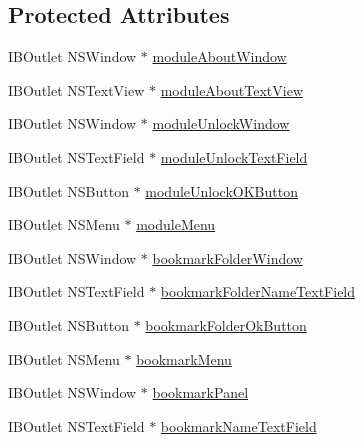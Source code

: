 \subsection*{Protected Attributes}
\begin{DoxyCompactItemize}
\item 
I\-B\-Outlet N\-S\-Window $\ast$ \hyperlink{interface_left_side_bar_view_controller_a1e4ea86bd5ee4a5fd7e020cee6fe9af7}{module\-About\-Window}
\item 
I\-B\-Outlet N\-S\-Text\-View $\ast$ \hyperlink{interface_left_side_bar_view_controller_a839025947128cd02e03a6919cd53d2ff}{module\-About\-Text\-View}
\item 
I\-B\-Outlet N\-S\-Window $\ast$ \hyperlink{interface_left_side_bar_view_controller_a779a4034ed4b58ecbd46b8160b66a813}{module\-Unlock\-Window}
\item 
I\-B\-Outlet N\-S\-Text\-Field $\ast$ \hyperlink{interface_left_side_bar_view_controller_ad02f4a39f2d83e2f0cec6b4806814f5f}{module\-Unlock\-Text\-Field}
\item 
I\-B\-Outlet N\-S\-Button $\ast$ \hyperlink{interface_left_side_bar_view_controller_ae5a86453a2ffc18776bce51a1eb735fe}{module\-Unlock\-O\-K\-Button}
\item 
I\-B\-Outlet N\-S\-Menu $\ast$ \hyperlink{interface_left_side_bar_view_controller_a7db6a582718e6fb4b4bf7d4e483e4c85}{module\-Menu}
\item 
I\-B\-Outlet N\-S\-Window $\ast$ \hyperlink{interface_left_side_bar_view_controller_a0d525fffbf58da7bfc279fc81c0466b8}{bookmark\-Folder\-Window}
\item 
I\-B\-Outlet N\-S\-Text\-Field $\ast$ \hyperlink{interface_left_side_bar_view_controller_a1d0054c7da6e997cbf329ff2fd2f1680}{bookmark\-Folder\-Name\-Text\-Field}
\item 
I\-B\-Outlet N\-S\-Button $\ast$ \hyperlink{interface_left_side_bar_view_controller_a1fbafbd56d1c846b9c4937b6544af42b}{bookmark\-Folder\-Ok\-Button}
\item 
I\-B\-Outlet N\-S\-Menu $\ast$ \hyperlink{interface_left_side_bar_view_controller_a39df7026c33abdcfa5f40779333873bb}{bookmark\-Menu}
\item 
I\-B\-Outlet N\-S\-Window $\ast$ \hyperlink{interface_left_side_bar_view_controller_a4098077edc73aac4233d27411c9c0140}{bookmark\-Panel}
\item 
I\-B\-Outlet N\-S\-Text\-Field $\ast$ \hyperlink{interface_left_side_bar_view_controller_a0cecdae5d24b004d5d43baa6a6d59cb2}{bookmark\-Name\-Text\-Field}
\item 

\end{DoxyCompactItemize}
